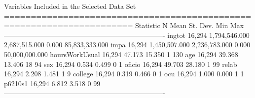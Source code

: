 
Variables Included in the Selected Data Set
======================================================================
Statistic        N        Mean        St. Dev.     Min       Max      
----------------------------------------------------------------------
ingtot         16,294 1,794,546.000 2,687,515.000 0.000 85,833,333.000
impa           16,294 1,450,507.000 2,236,783.000 0.000 50,000,000.000
hoursWorkUsual 16,294    47.173        15.350       1        130      
age            16,294    39.368        13.406      18         94      
sex            16,294     0.534         0.499       0         1       
oficio         16,294    49.703        28.180       1         99      
relab          16,294     2.208         1.481       1         9       
college        16,294     0.319         0.466       0         1       
ocu            16,294     1.000         0.000       1         1       
p6210s1        16,294     6.812         3.518       0         99      
----------------------------------------------------------------------
